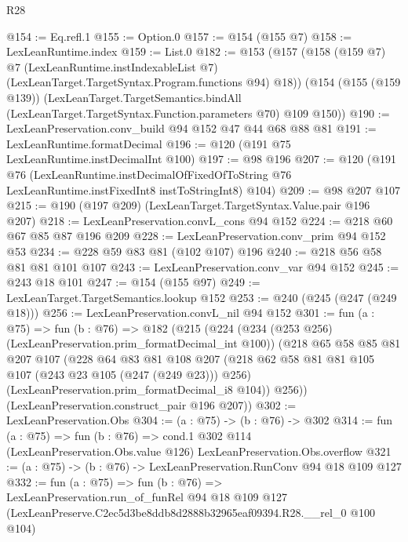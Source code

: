\begin{lexlean}{R28}
\begin{coremodule}
@154 := Eq.refl.{1}
@155 := Option.{0}
@157 := @154 (@155 @7)
@158 := LexLeanRuntime.index
@159 := List.{0}
@182 := @153
    (@157
      (@158
        (@159 @7)
        @7
        (LexLeanRuntime.instIndexableList @7)
        (LexLeanTarget.TargetSyntax.Program.functions @94)
        @18))
    (@154
      (@155 (@159 @139))
      (LexLeanTarget.TargetSemantics.bindAll
        (LexLeanTarget.TargetSyntax.Function.parameters @70)
        @109
        @150))
@190 := LexLeanPreservation.conv_build @94 @152 @47 @44 @68 @88 @81
@191 := LexLeanRuntime.formatDecimal
@196 := @120 (@191 @75 LexLeanRuntime.instDecimalInt @100)
@197 := @98 @196
@207 := @120
    (@191
      @76
      (LexLeanRuntime.instDecimalOfFixedOfToString
        @76
        LexLeanRuntime.instFixedInt8
        instToStringInt8)
      @104)
@209 := @98 @207 @107
@215 := @190 (@197 @209) (LexLeanTarget.TargetSyntax.Value.pair @196 @207)
@218 := LexLeanPreservation.convL_cons @94 @152
@224 := @218 @60 @67 @85 @87 @196 @209
@228 := LexLeanPreservation.conv_prim @94 @152 @53
@234 := @228 @59 @83 @81 (@102 @107) @196
@240 := @218 @56 @58 @81 @81 @101 @107
@243 := LexLeanPreservation.conv_var @94 @152
@245 := @243 @18 @101
@247 := @154 (@155 @97)
@249 := LexLeanTarget.TargetSemantics.lookup @152
@253 := @240 (@245 (@247 (@249 @18)))
@256 := LexLeanPreservation.convL_nil @94 @152
@301 := fun (a : @75) =>
  fun (b : @76) =>
  @182
    (@215
      (@224
        (@234 (@253 @256) (LexLeanPreservation.prim_formatDecimal_int @100))
        (@218
          @65
          @58
          @85
          @81
          @207
          @107
          (@228
            @64
            @83
            @81
            @108
            @207
            (@218 @62 @58 @81 @81 @105 @107 (@243 @23 @105 (@247 (@249 @23))) @256)
            (LexLeanPreservation.prim_formatDecimal_i8 @104))
          @256))
      (LexLeanPreservation.construct_pair @196 @207))
@302 := LexLeanPreservation.Obs
@304 := (a : @75) -> (b : @76) -> @302
@314 := fun (a : @75) =>
  fun (b : @76) =>
  cond.{1} @302 @114 (LexLeanPreservation.Obs.value @126) LexLeanPreservation.Obs.overflow
@321 := (a : @75) -> (b : @76) -> LexLeanPreservation.RunConv @94 @18 @109 @127
@332 := fun (a : @75) =>
  fun (b : @76) =>
  LexLeanPreservation.run_of_funRel
    @94
    @18
    @109
    @127
    (LexLeanPreserve.C2ec5d3be8ddb8d2888b32965eaf09394.R28.__rel_0 @100 @104)
\end{coremodule}
\end{lexlean}
